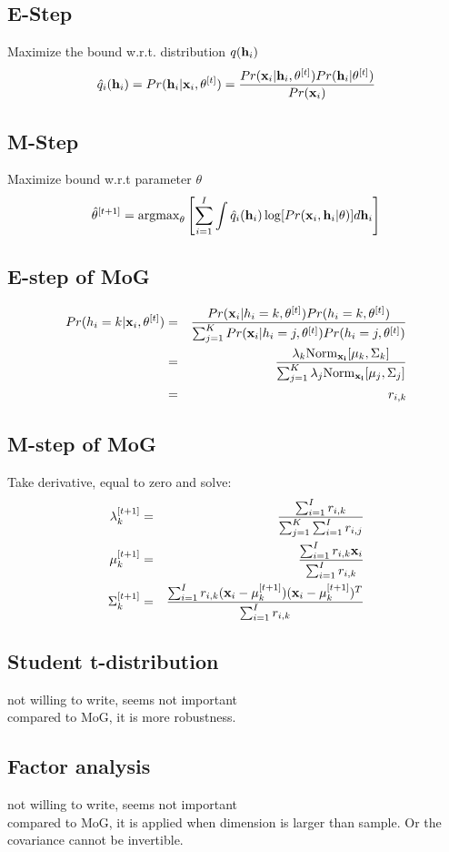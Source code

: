 \documentclass[12pt,a4paper]{article}
\begin{document}
\subsection*{E-Step}
Maximize the bound w.r.t. distribution $q({\bf h}_i)$
$$
\hat q_i({\bf h}_i) = Pr({\bf h}_i|{\bf x}_i,{\bf \theta}^{[t]}) = \frac{ Pr({\bf x}_i|{\bf h}_i,{\bf \theta}^{[t]})Pr({\bf h}_i|\theta^{[t]})}{Pr({\bf x}_i)}
$$
\subsection*{M-Step}
Maximize bound w.r.t parameter $\theta$
$$
\hat \theta^{[t+1]} = {\rm argmax}_{\theta}\left[\sum_{i=1}^{I}\int \hat q_i({\bf h}_i)\log [Pr({\bf x}_i,{\bf h}_i|\theta)] d{\bf h}_i\right]
$$
\subsection*{E-step of MoG}
\begin{eqnarray*}
Pr(h_i=k|{\bf x}_i,\theta^{[t]}) &=& \frac{Pr({\bf x}_i|h_i=k,\theta^{[t]})Pr(h_i=k,\theta^{[t]})}{\sum_{j=1}^{K}Pr({\bf x}_i|h_i=j,\theta^{[t]})Pr(h_i=j,\theta^{[t]})}\\
&=& \frac{\lambda_k {\rm Norm}_{\bf x_i}[\mu_k,\Sigma_k]}{\sum_{j=1}^{K}\lambda_j {\rm Norm}_{\bf x_i}[\mu_j,\Sigma_j]}\\
&=& r_{i,k}
\end{eqnarray*}
\subsection*{M-step of MoG}
Take derivative, equal to zero and solve:
\begin{eqnarray*}
\lambda_k^{[t+1]} &=& \frac{\sum_{i=1}^{I} r_{i,k}}{\sum_{j=1}^{K}\sum_{i=1}^{I}r_{i,j}} \\
\mu_k^{[t+1]} &=& \frac{\sum_{i=1}^{I}r_{i,k}{\bf x}_i}{\sum_{i=1}^{I}r_{i,k}}\\
\Sigma_k^{[t+1]} &=& \frac{\sum_{i=1}^{I}r_{i,k}({\bf x}_i-\mu_k^{[t+1]})({\bf x}_i-\mu_k^{[t+1]})^T}{\sum_{i=1}^{I}r_{i,k}} 
\end{eqnarray*}
\subsection*{Student t-distribution}
not willing to write, seems not important\\
compared to MoG, it is more robustness.
\subsection*{Factor analysis}
not willing to write, seems not important\\
compared to MoG, it is applied when dimension is larger than sample. Or the covariance cannot be invertible.
\end{document}
